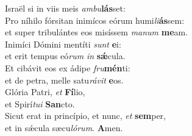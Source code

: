 \evenverse Israël si in viis meis \textit{am}\textit{bu}\textbf{lás}set:\\
\oddverse Pro níhilo fórsitan inimícos eórum humi\textit{li}\textbf{ás}sem:~\*\\
\oddverse et super tribulántes eos misíssem \textit{ma}\textit{num} \textbf{me}am.\\
\evenverse Inimíci Dómini mentíti \textit{sunt} \textbf{e}i:~\*\\
\evenverse et erit tempus eó\textit{rum} \textit{in} \textbf{sǽ}cula.\\
\oddverse Et cibávit eos ex ádipe \textit{fru}\textbf{mén}ti:~\*\\
\oddverse et de petra, melle satu\textit{rá}\textit{vit} \textbf{e}os.\\
\evenverse Glória Patri, \textit{et} \textbf{Fí}lio,~\*\\
\evenverse et Spirí\textit{tu}\textit{i} \textbf{San}cto.\\
\oddverse Sicut erat in princípio, et nunc, \textit{et} \textbf{sem}per,~\*\\
\oddverse et in sǽcula sæcu\textit{ló}\textit{rum}. \textbf{A}men.\\
